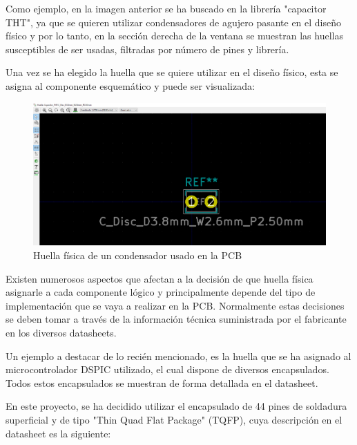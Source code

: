 Como ejemplo, en la imagen anterior se ha buscado en la librería "capacitor THT", ya que se quieren utilizar condensadores de agujero pasante en el diseño físico y por lo tanto, en la sección derecha de la ventana se muestran las huellas susceptibles de ser usadas, filtradas por número de pines y librería.

Una vez se ha elegido la huella que se quiere utilizar en el diseño físico, esta se asigna al componente esquemático y puede ser visualizada:


\begin{figure}[H]
\centering 
\includegraphics[width=1.05\linewidth]{pictures/huellaCondensador.PNG}
\caption{Huella física  de un condensador usado en la PCB}
\label{fig:kdiagram}
\end{figure}

Existen numerosos aspectos que afectan a la decisión de que huella física asignarle a cada componente lógico y principalmente depende del tipo de implementación que se vaya a realizar en la PCB. Normalmente estas decisiones se deben tomar a través de la información técnica suministrada por el fabricante en los diversos datasheets.

Un ejemplo a destacar de lo recién mencionado, es la huella que se ha asignado al microcontrolador DSPIC utilizado, el cual dispone de diversos encapsulados. Todos estos encapsulados se muestran de forma detallada en el datasheet. 

En este proyecto, se ha decidido utilizar el encapsulado de 44 pines de soldadura superficial y de tipo "Thin Quad Flat Package" (TQFP), cuya descripción en el datasheet es la siguiente:

